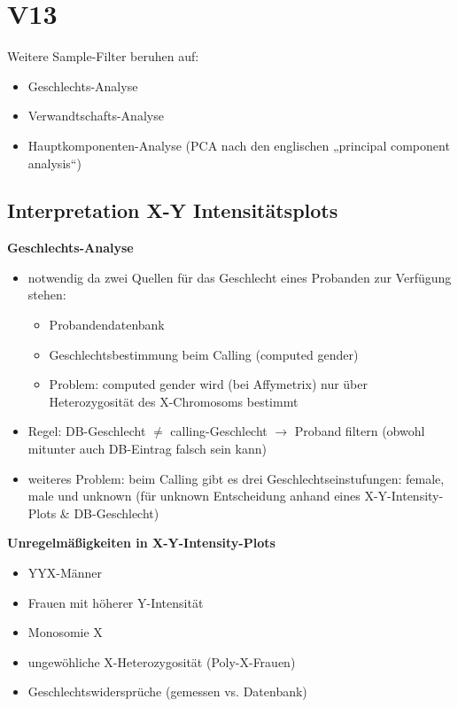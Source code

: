 \section{V13}
Weitere Sample-Filter beruhen auf:
\begin{itemize}
	\item Geschlechts-Analyse
	\item Verwandtschafts-Analyse
	\item Hauptkomponenten-Analyse (PCA nach den englischen „principal component analysis“)
\end{itemize}

\subsection{Interpretation X-Y Intensitätsplots}
\textbf{Geschlechts-Analyse}\\
\begin{itemize}
	\item notwendig da zwei Quellen für das Geschlecht eines Probanden zur Verfügung stehen:
	\begin{itemize}
		\item Probandendatenbank
		\item Geschlechtsbestimmung beim Calling (computed gender)
		\item Problem: computed gender wird (bei Affymetrix) nur über Heterozygosität des X-Chromosoms bestimmt
	\end{itemize}
	\item Regel: DB-Geschlecht $\neq$ calling-Geschlecht $\rightarrow$ Proband filtern (obwohl mitunter auch DB-Eintrag falsch sein kann)
	\item weiteres Problem: beim Calling gibt es drei Geschlechtseinstufungen: female, male und unknown (für unknown Entscheidung anhand eines X-Y-Intensity-Plots \& DB-Geschlecht)
\end{itemize}

\textbf{Unregelmäßigkeiten in X-Y-Intensity-Plots}\\
\begin{itemize}
	\item YYX-Männer
	\item Frauen mit höherer Y-Intensität
	\item Monosomie X
	\item ungewöhliche X-Heterozygosität (Poly-X-Frauen)
	\item Geschlechtswidersprüche (gemessen vs. Datenbank)
\end{itemize}

